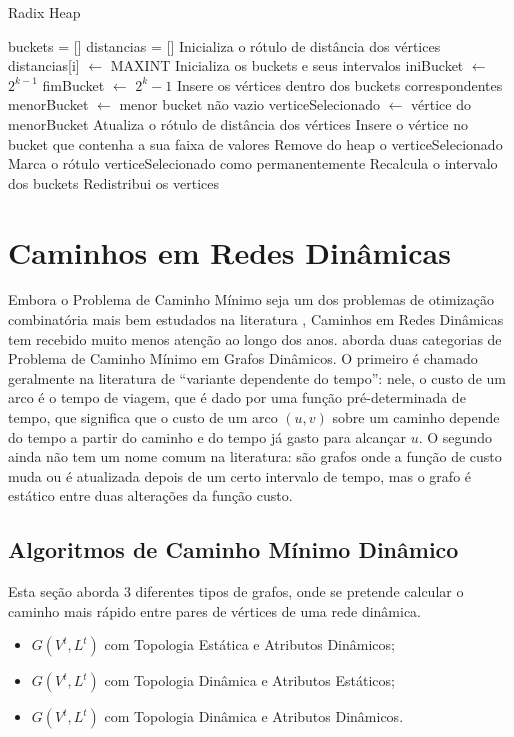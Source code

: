 \begin{algorithm}
\caption{Radix Heap}
\begin{algorithmic}[1]
\State buckets = []
\State distancias = []
\State Inicializa o rótulo de distância dos vértices
  \State distancias[i] $\leftarrow$ MAXINT
\EndFor
\State Inicializa os buckets e seus intervalos
  \State iniBucket $\leftarrow$ $2^{k - 1}$
  \State fimBucket $\leftarrow$ $2^k - 1$
\EndFor
\State Insere os vértices dentro dos buckets correspondentes
  \State menorBucket $\leftarrow$ menor bucket não vazio
    \State verticeSelecionado $\leftarrow$ vértice do menorBucket
      \State Atualiza o rótulo de distância dos vértices \label{trechoradix}
      \State Insere o vértice no bucket que contenha a sua faixa de valores
    \EndFor
    \State Remove do heap o verticeSelecionado
    \State Marca o rótulo verticeSelecionado como permanentemente
  \Else
    \State Recalcula o intervalo dos buckets
    \State Redistribui os vertices
  \EndIf
\EndWhile
\end{algorithmic}
\label{codeRadix}
\end{algorithm}
\FloatBarrier

\section{Caminhos em Redes Dinâmicas}
\label{sec:pathdyn}
Embora o Problema de Caminho Mínimo seja um dos problemas de otimização combinatória mais bem estudados
na literatura \cite{bookahuja}, Caminhos em Redes Dinâmicas tem recebido muito menos atenção ao longo dos anos.
\cite{giacomo} aborda duas categorias de Problema de Caminho Mínimo em Grafos Dinâmicos. O primeiro é chamado
geralmente na literatura de ``variante dependente do tempo'': nele, o custo de um arco é o tempo de viagem, que é dado
por uma função pré-determinada de tempo, que significa que o custo de um arco $(u, v)$ sobre um caminho
depende do tempo a partir do caminho e do tempo já gasto para alcançar $u$.
O segundo ainda não tem um nome comum na literatura: são grafos onde a função de custo muda ou é atualizada
depois de um certo intervalo de tempo, mas o grafo é estático entre duas alterações da função custo.

\subsection{Algoritmos de Caminho Mínimo Dinâmico}
Esta seção aborda 3 diferentes tipos de grafos, onde se pretende calcular o caminho mais rápido entre pares de vértices
de uma rede dinâmica.
\begin{itemize}
\item $G(V^t, L^t)$ com Topologia Estática e Atributos Dinâmicos;
\item $G(V^t, L^t)$ com Topologia Dinâmica e Atributos Estáticos;
\item $G(V^t, L^t)$ com Topologia Dinâmica e Atributos Dinâmicos.
\end{itemize}


